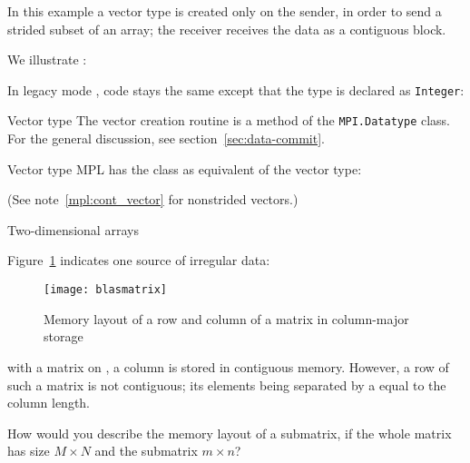 In this example a vector type is created only on the sender, in order to send
a strided subset of an array; the receiver receives the data as a contiguous block.

We illustrate :
%

In legacy mode , code stays the same except that the type is
declared as \lstinline{Integer}:
%

\begin{pythonnote}{Vector type}
  The vector creation routine is a method of the
  \lstinline+MPI.Datatype+  class. 
  For the general discussion, see section~\ref{sec:data-commit}.
\end{pythonnote}


\begin{mplnote}{Vector type}
  \label{mpl:strided_vector}
  MPL has the  class as equivalent
  of the vector type:

  (See note~\ref{mpl:cont_vector} for nonstrided vectors.)
\end{mplnote}

 {Two-dimensional arrays}

Figure~\ref{fig:blasmatrix} indicates one source of irregular
data:
%
\begin{figure}[t]
  \texttt{[image: blasmatrix]}
  \caption{Memory layout of a row and column of a matrix in column-major storage}
  \label{fig:blasmatrix}
\end{figure}
%
with a matrix on , a column is
stored in contiguous memory. However, a row of such a matrix
is not contiguous; its elements being separated by a 
equal to the column length.

\begin{exercise}
  \label{ex:submatrix}
  How would you describe the memory layout of a submatrix,
  if the whole matrix has size $M\times N$ and the submatrix $m\times n$?
\end{exercise}


